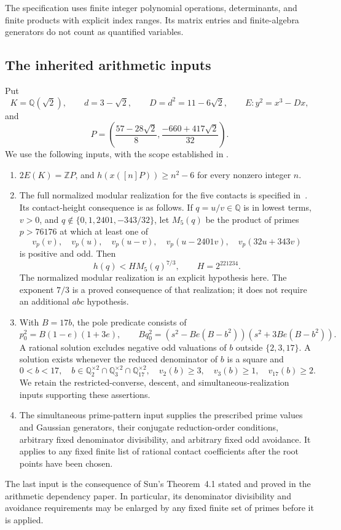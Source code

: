 \documentclass[11pt,a4paper]{article}
\newcommand{\Q}{\mathbb Q}\newcommand{\Z}{\mathbb Z}
\begin{document}
The specification uses finite integer polynomial operations,
determinants, and finite products with explicit index ranges. Its
matrix entries and finite-algebra generators do not count as
quantified variables.

\subsection{The inherited arithmetic inputs}\label{sec:inputs}

Put
\[
 K=\Q(\sqrt2),\qquad d=3-\sqrt2,\qquad D=d^2=11-6\sqrt2,
 \qquad E:y^2=x^3-Dx,
\]
and
\[
 P=\left(\frac{57-28\sqrt2}{8},
          \frac{-660+417\sqrt2}{32}\right).
\]
We use the following inputs, with the scope established in
\cite{Dependencies}.
\begin{enumerate}
\item $2E(K)=\Z P$, and $h(x([n]P))\ge n^2-6$ for every
nonzero integer $n$.
\item The full normalized modular realization for the five contacts is
specified in~\cite{Evaluation,Multiplicity}. Its contact-height
consequence is as follows. If $q=u/v\in\Q$ is in lowest terms,
$v>0$, and $q\notin\{0,1,2401,-343/32\}$, let $M_5(q)$ be the
product of primes $p>76176$ at which at least one of
\[
 v_p(v),\quad v_p(u),\quad v_p(u-v),\quad
 v_p(u-2401v),\quad v_p(32u+343v)
\]
is positive and odd. Then
\begin{equation}\label{eq:contact-height}
                  h(q)<H M_5(q)^{7/3},\qquad H=2^{221234}.
\end{equation}
The normalized modular realization is an explicit hypothesis here.
The exponent $7/3$ is a proved consequence of that realization;
it does not require an additional $abc$ hypothesis.
\item With $B=17b$, the pole predicate consists of
\begin{equation}\label{eq:pole}
 p_0^2=B(1-e)(1+3e),\qquad
 Bq_0^2=(s^2-Be(B-b^2))(s^2+3Be(B-b^2)).
\end{equation}
A rational solution excludes negative odd valuations of $b$ outside
$\{2,3,17\}$. A solution exists whenever the reduced denominator of
$b$ is a square and
\begin{equation}\label{eq:pole-preparation}
 0<b<17,\quad b\in\Q_2^{\times2}\cap\Q_3^{\times2}
                  \cap\Q_{17}^{\times2},\quad
 v_2(b)\ge3,\quad v_3(b)\ge1,\quad v_{17}(b)\ge2.
\end{equation}
We retain the restricted-converse, descent, and simultaneous-realization
inputs supporting these assertions.
\item The simultaneous prime-pattern input supplies the prescribed
prime values and Gaussian generators, their conjugate reduction-order
conditions, arbitrary fixed denominator divisibility, and arbitrary
fixed odd avoidance. It applies to any fixed finite list of rational
contact coefficients after the root points have been chosen.
\end{enumerate}
The last input is the consequence of Sun's Theorem~4.1 stated and proved
in the arithmetic dependency paper. In particular, its denominator
divisibility and avoidance requirements may be enlarged by any fixed
finite set of primes before it is applied.
\end{document}

